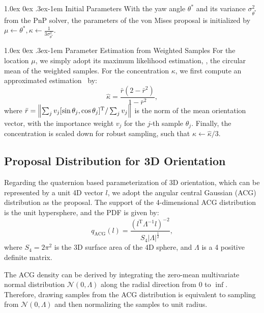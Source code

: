 \documentclass[10pt,twocolumn,letterpaper]{article}
\makeatletter
\let\originalleft\left
\let\originalright\right
\renewcommand{\left}{\mathopen{}\mathclose\bgroup\originalleft}
\renewcommand{\right}{\aftergroup\egroup\originalright}
\renewcommand{\paragraph}{
  \@startsection{paragraph}{4}
  {\z@}{1.0ex \@plus 0ex \@minus .3ex}{-1em}
  {\normalfont\normalsize\bfseries}
}
\makeatother
\begin{document}
\paragraph{Initial Parameters}
With the yaw angle $\theta^\ast$ and its variance $\sigma^2_{\theta^\ast}$ from the PnP solver, the parameters of the von Mises proposal is initialized by $\mu \gets \theta^\ast, \kappa \gets \frac{1}{3\sigma^2_{\theta^\ast}}$.

\paragraph{Parameter Estimation from Weighted Samples}
For the location $\mu$, we simply adopt its maximum likelihood estimation, \ie, the circular mean of the weighted samples. For the concentration $\kappa$, we first compute an approximated estimation~\cite{Dhillon2003ModelingDU} by:
\begin{equation}
    \hat{\kappa} = \frac{\bar{r}(2-\bar{r}^2)}{1-\bar{r}^2},
\end{equation}
where $\bar{r} = \left\lVert \sum_j v_j[\sin{\theta_j}, \cos{\theta_j}]^\text{T} / \sum_j v_j \right\rVert$ is the norm of the mean orientation vector, with the importance weight $v_j$ for the $j$-th sample $\theta_j$. Finally, the concentration is scaled down for robust sampling, such that $\kappa \gets \hat{\kappa}/3$.

\subsection{Proposal Distribution for 3D Orientation} Regarding the quaternion based parameterization of 3D orientation, which can be represented by a unit 4D vector $l$, we adopt the angular central Gaussian (ACG) distribution as the proposal. The support of the 4-dimensional ACG distribution is the unit hypersphere, and the PDF is given by:
\begin{equation}
    q_\text{ACG}(l) = \frac{(l^\text{T} \Lambda^{-1} l)^{-2}}{S_4 |\Lambda|^{\frac{1}{2}}},
\end{equation}
where $S_4 = 2 \pi^2$ is the 3D surface area of the 4D sphere, and $\Lambda$ is a 4 positive definite matrix.

The ACG density can be derived by integrating the zero-mean multivariate normal distribution $\mathcal{N}(0, \Lambda)$ along the radial direction from $0$ to $\inf$. Therefore, drawing samples from the ACG distribution is equivalent to sampling from $\mathcal{N}(0, \Lambda)$ and then normalizing the samples to unit radius.
\end{document}
